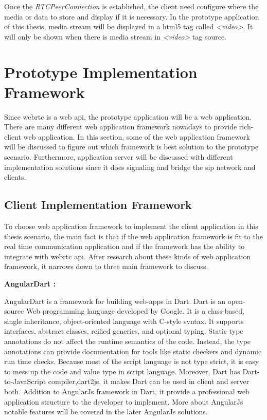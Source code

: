 \par Once the \textit{RTCPeerConnection} is established, the client need configure where the media or data to store and display if it is necessary. In the prototype application of this thesis, media stream will be displayed in a \gls{html5} tag called \textit{<video>}. It will only be shown when there is media stream in \textit{<video>} tag source.

\section{Prototype Implementation Framework}

\noindent Since \gls{webrtc} is a web \gls{api}, the prototype application will be a web application. There are many different web application framework nowadays to provide rich-client web application. In this section, some of the web application framework will be discussed to figure out which framework is best solution to the prototype scenario. Furthermore, application server will be discussed with different implementation solutions since it does signaling and bridge the \gls{sip} network and clients.

\subsection{Client Implementation Framework}

\noindent To choose web application framework to implement the client application in this thesis scenario, the main fact is that if the web  application framework is fit to the real time communication application and if the framework has the ability to integrate with \gls{webrtc} \gls{api}. After research about these kinds of web application framework, it narrows down to three main framework to discuss.

\textbf{AngularDart :}

\par AngularDart is a framework for building web-apps in Dart. Dart is an open-source Web programming language developed by Google. It is a class-based, single inheritance, object-oriented language with C-style syntax. It supports interfaces, abstract classes, reified generics, and optional typing. Static type annotations do not affect the runtime semantics of the code. Instead, the type annotations can provide documentation for tools like static checkers and dynamic run time checks.\cite{wiki:dart} Because most of the script language is not type strict, it is easy to mess up the code and value type in script language. Moreover, Dart has Dart-to-JavaScript compiler,dart2js, it makes Dart can be used in client and server both. Addition to AngularJs framework in Dart, it provide a professional web application structure to the developer to implement. More about AngularJs notable features will be covered in the later AngularJs solutions. 

